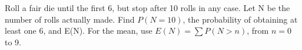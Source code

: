 \documentclass[11pt]{article}
\begin{document}
Roll a fair die until the first 6, but stop after 10 rolls in any case. Let N be the number of rolls actually made. Find \(P(N=10)\), the probability of obtaining at least one 6, and E(N). For the mean, use \(E(N)=\sum  P(N>n)\), from \(n=0\) to 9.\par
\vspace{5pt}
\end{document}
